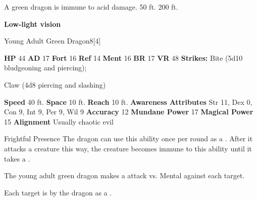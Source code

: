       
       A green dragon is immune to acid damage.
     50 ft.
     200 ft.
    \par\noindent\textbf{Low-light vision}
  

  \begin{monsubsection}{Young Adult Green Dragon}{8}[4]
    \vspace{-1em}\vspace{-1em}
    \vspace{0em}

    
    

    \begin{spellcontent}
      \begin{spelltargetinginfo}
        \pari \textbf{HP} 44 \monsep
          \textbf{AD} 17 \monsep
          \textbf{Fort} 16 \monsep
          \textbf{Ref} 14 \monsep
          \textbf{Ment} 16
        \pari \textbf{BR} 17 \monsep
        \textbf{VR} 48
        \pari \textbf{Strikes:}
            Bite  (5d10 bludgeoning and piercing);
\par Claw  (4d8 piercing and slashing)
      \end{spelltargetinginfo}
    \end{spellcontent}
    \begin{monsterfooter}
      \pari \textbf{Speed} 40 ft. \monsep
        \textbf{Space} 10 ft. \monsep
        \textbf{Reach} 10 ft.
      \pari \textbf{Awareness} 
      \pari \textbf{Attributes}
        Str 11, Dex 0,
        Con 9, Int 9,
        Per 9, Wil 9
      \pari \textbf{Accuracy} 12 \monsep
        \textbf{Mundane Power} 17 \monsep
      \textbf{Magical Power} 15
      \pari \textbf{Alignment} Usually chaotic evil
    \end{monsterfooter}
  \end{monsubsection}
  \begin{freeability}{Frightful Presence}
      The dragon can use this ability once per round as a .
      After it attacks a creature this way, the creature becomes immune to this ability until it takes a .
      \par The young adult green dragon makes a  attack
        vs. Mental against each target.
    
    \hit Each target is  by the dragon as a .
    \end{freeability}
  

